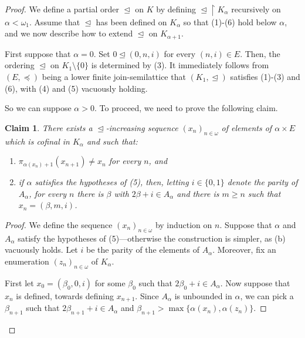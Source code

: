 \documentclass[]{amsart}
\newtheorem{claim}{Claim}[theorem]
\theoremstyle{definition}
\theoremstyle{remark}
\begin{document}
\begin{proof}
We define a partial order $\trianglelefteq$ on $K$ by defining ${\trianglelefteq} \upharpoonright K_\alpha$ recursively on $\alpha < \omega_1$. Assume that $\trianglelefteq$ has been defined on $K_\alpha$ so that (1)-(6) hold below $\alpha$, and we now describe how to extend $\trianglelefteq$ on $K_{\alpha+1}$. 

First suppose that $\alpha = 0$. Set $0 \trianglelefteq (0, n, i)$ for every $(n, i) \in E$. Then, the ordering $\trianglelefteq$ on $K_1 \setminus \{0\}$ is determined by (3). It immediately follows from $(E, \preceq)$ being a lower finite join-semilattice that $(K_1, \trianglelefteq)$ satisfies (1)-(3) and (6), with (4) and (5) vacuously holding. 

So we can suppose $\alpha > 0$. To proceed, we need to prove the following claim.

\begin{claim}\label{thm:main3:claim4}
There exists a $\trianglelefteq$-increasing sequence $(x_n)_{n\in\omega}$ of elements of $\alpha \times E$ which is cofinal in $K_\alpha$ and such that:
\begin{enumerate}[label={\upshape(\alph*)}]
\item $\pi_{\alpha(x_n)+1}(x_{n+1}) \neq x_n$ for every $n$, and
\item if $\alpha$ satisfies the hypotheses of {\upshape (5)}, then, letting $i \in \{0,1\}$ denote the parity of $A_\alpha$, for every $n$ there is $\beta$ with $2\beta+i \in A_\alpha$ and there is $m \ge n$ such that $x_n = (\beta, m, i)$.
\end{enumerate}
\end{claim}
\begin{proof}
We define the sequence $(x_n)_{n\in\omega}$ by induction on $n$. Suppose that $\alpha$ and $A_\alpha$ satisfy the hypotheses of (5)---otherwise the construction is simpler, as (b) vacuously holds. Let $i$ be the parity of the elements of $A_\alpha$. Moreover, fix an enumeration $(z_n)_{n\in\omega}$ of $K_\alpha$. 

First let $x_0 = (\beta_0, 0, i)$ for some $\beta_0$ such that $2\beta_0 + i \in A_\alpha$. Now suppose that $x_n$ is defined, towards defining $x_{n+1}$. Since $A_\alpha$ is unbounded in $\alpha$, we can pick a $\beta_{n+1}$ such that $2\beta_{n+1}+i \in A_\alpha$ and $\beta_{n+1} > \max\{\alpha (x_n), \alpha (z_n)\}$. 


\end{proof}
\end{proof}
\end{document}
